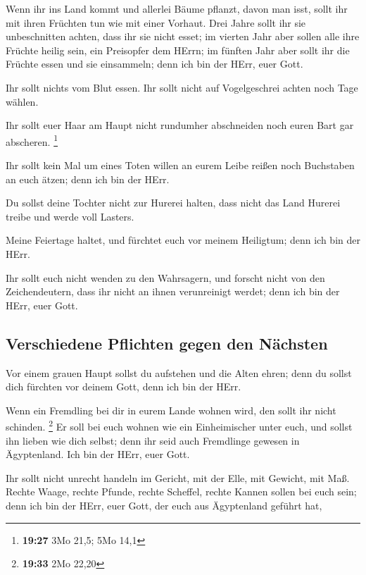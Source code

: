  Wenn ihr ins Land kommt und allerlei Bäume pflanzt,
davon man isst, sollt ihr mit ihren Früchten tun wie mit einer Vorhaut.
Drei Jahre sollt ihr sie unbeschnitten achten, dass ihr sie nicht esset;
 im vierten Jahr aber sollen alle ihre Früchte heilig
sein, ein Preisopfer dem HErrn;  im fünften Jahr aber
sollt ihr die Früchte essen und sie einsammeln; denn ich bin der HErr,
euer Gott.

 Ihr sollt nichts vom Blut essen. Ihr sollt nicht auf
Vogelgeschrei achten noch Tage wählen.

 Ihr sollt euer Haar am Haupt nicht rundumher abschneiden
noch euren Bart gar abscheren. \footnote{\textbf{19:27} 3Mo 21,5; 5Mo
  14,1}

 Ihr sollt kein Mal um eines Toten willen an eurem Leibe
reißen noch Buchstaben an euch ätzen; denn ich bin der HErr.

 Du sollst deine Tochter nicht zur Hurerei halten, dass
nicht das Land Hurerei treibe und werde voll Lasters.

 Meine Feiertage haltet, und fürchtet euch vor meinem
Heiligtum; denn ich bin der HErr.

 Ihr sollt euch nicht wenden zu den Wahrsagern, und
forscht nicht von den Zeichendeutern, dass ihr nicht an ihnen
verunreinigt werdet; denn ich bin der HErr, euer Gott.

\hypertarget{verschiedene-pflichten-gegen-den-nuxe4chsten}{%
\subsection{Verschiedene Pflichten gegen den
Nächsten}\label{verschiedene-pflichten-gegen-den-nuxe4chsten}}

 Vor einem grauen Haupt sollst du aufstehen und die Alten
ehren; denn du sollst dich fürchten vor deinem Gott, denn ich bin der
HErr.

 Wenn ein Fremdling bei dir in eurem Lande wohnen wird,
den sollt ihr nicht schinden. \footnote{\textbf{19:33} 2Mo 22,20}
 Er soll bei euch wohnen wie ein Einheimischer unter
euch, und sollst ihn lieben wie dich selbst; denn ihr seid auch
Fremdlinge gewesen in Ägyptenland. Ich bin der HErr, euer Gott.

 Ihr sollt nicht unrecht handeln im Gericht, mit der
Elle, mit Gewicht, mit Maß.  Rechte Waage, rechte Pfunde,
rechte Scheffel, rechte Kannen sollen bei euch sein; denn ich bin der
HErr, euer Gott, der euch aus Ägyptenland geführt hat,

